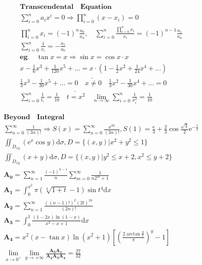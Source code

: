 \documentclass{article}
\begin{document}
\clearpage
\begin{align*}
    \bm{Transcendental \quad Equation} \\ 
    \sum_{i=0}^{n}a_{i}x^i = 0 \Longrightarrow \prod_{i=0}^{n}(x-x_{i})=0 \\ 
    \prod_{i=0}^{n}x_{i} = (-1)^{n}\frac{a_{0}}{a_{n}},\quad \sum_{i=0}^{n}\frac{\prod_{i=0}^{n}x_{i}}{x_{i}} = (-1)^{n-1}\frac{a_{1}}{a_{n}} \\ 
    \sum_{i=0}^{n}\frac{1}{x_{i}} = -\frac{a_{1}}{a_{0}} \\ 
    \bm{eg.} \quad \tan x = x \Longrightarrow \sin{x} = \cos{x} \cdot x \\
    x - \frac{1}{6}x^3 + \frac{1}{120}x^5 +... = x \cdot (1-\frac{1}{2}x^2+\frac{1}{24}x^4+...) \\
    \frac{1}{3}x^3-\frac{1}{30}x^5+... = 0 \quad \underrightarrow{x \not= 0} \quad \frac{1}{3}x^2-\frac{1}{30}x^4+... = 0 \\
    \sum_{i=0}^{n}\frac{1}{t_{i}} = \frac{1}{10} \quad \underrightarrow{t = x^2} \quad \lim_{n \to \infty}\sum_{i=0}^{n}\frac{1}{x_{i}^2} = \frac{1}{10} 
\end{align*}

\clearpage

\begin{align*}
    \bm{Beyond \quad Integral} \\
    \sum_{n=0}^\infty \frac{1}{(3n)!} \Longrightarrow S(x) = \sum_{n=0}^{\infty}{\frac{x^{3n}}{(3n)!}} ,S(1) = \frac{\mathrm{e}}{3}+\frac{2}{3}\cos\frac{\sqrt{3}}{2}\mathrm{e}^{-\frac{1}{2}}\\ 
    \iint_{D_{xy}}(\mathrm{e}^{x}\cos y)\mathrm{d}\sigma, D=\{(x,y)|x^2+y^2 \le 1\} \\ 
    \iint_{D_{xy}} (x+y)\mathrm{d}\sigma , D=\{(x,y)|y^2 \le x+2, x^2 \le y+2\} \\
    \bm{A_{0}} = \sum_{n=1}^\infty\frac{(-1)^{n-1}}{n}\sum_{m=0}^\infty\frac{1}{n2^m+1} \\
    \bm{A_{1}} = \int_{0}^{x^2} \pi(\sqrt[4]{1+t}-1)\sin t^4 \mathrm{d}x\\ 
    \bm{A_{2}} = \sum_{n=1}^\infty \frac{((n-1)!)^2(2t)^{2n}}{(2n)!} \\
    \bm{A_{3}} = \int_{0}^1\frac{(1-2x)\ln(1-x)}{x^2-x+1}\mathrm{d}x\\
    \bm{A_{4}} = x^2(x-\tan x)\ln(x^2+1)[\left(\frac{2\arctan \frac{y}{x}}{\pi}\right)^y-1] \\ 
    \lim_{x \to 0^{+}} \lim_{y \to +\infty}\frac{\bm{A_{0}}\bm{A_{1}}}{\bm{A_{2}}\bm{A_{3}}\bm{A_{4}}} = \frac{27}{32}\\
\end{align*}
\end{document}
